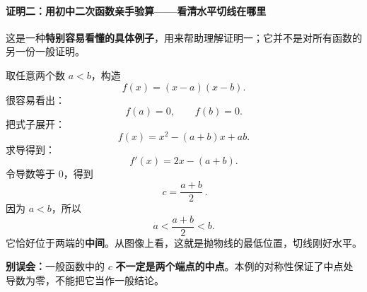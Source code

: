\begin{proofbox}
\par\medskip
\noindent\begin{minipage}{\linewidth}
\paragraph{证明二：用初中二次函数亲手验算——看清水平切线在哪里}
\begin{center}\end{center}
\end{minipage}\par\medskip

这是一种\textbf{特别容易看懂的具体例子}，用来帮助理解证明一；它并不是对所有函数的另一份一般证明。

取任意两个数 $a<b$，构造
\[
f(x)=(x-a)(x-b).
\]
很容易看出：
\[
f(a)=0,\qquad f(b)=0.
\]
把式子展开：
\[
f(x)=x^2-(a+b)x+ab.
\]
求导得到：
\[
f'(x)=2x-(a+b).
\]
令导数等于 $0$，得到
\[
\boxed{\ c=\frac{a+b}{2}\ }.
\]
因为 $a<b$，所以
\[
a<\frac{a+b}{2}<b.
\]
它恰好位于两端的\textbf{中间}。从图像上看，这就是抛物线的最低位置，切线刚好水平。

\textbf{别误会：}一般函数中的 $c$ \textbf{不一定是两个端点的中点}。本例的对称性保证了中点处导数为零，不能把它当作一般结论。
\end{proofbox}
\clearpage
